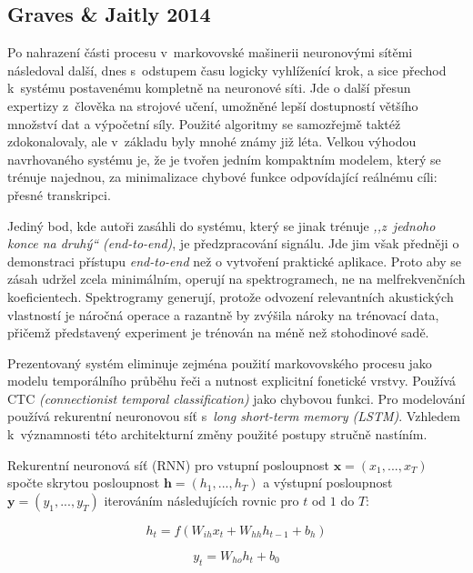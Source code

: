 \subsection{Graves & Jaitly 2014}

Po nahrazení části procesu v~markovovské mašinerii neuronovými sítěmi následoval
další, dnes s~odstupem času logicky vyhlíženící krok, a sice přechod k~systému
postavenému kompletně na neuronové síti. Jde o další přesun expertizy z~člověka
na strojové učení, umožněné lepší dostupností většího množství dat a výpočetní
síly. Použité algoritmy se samozřejmě taktéž zdokonalovaly, ale v~základu byly
mnohé známy již léta. Velkou výhodou navrhovaného systému je, že je tvořen jedním kompaktním
modelem, který se trénuje najednou, za minimalizace chybové funkce odpovídající
reálnému cíli: přesné transkripci.

Jediný bod, kde autoři zasáhli do systému, který se jinak trénuje \textit{,,z~jednoho
konce na druhý`` (end-to-end)}, je předzpracování signálu. Jde jim však předněji
o demonstraci přístupu \textit{end-to-end} než o vytvoření praktické aplikace.
Proto aby se zásah udržel zcela minimálním, operují na spektrogramech, ne na
melfrekvenčních koeficientech. Spektrogramy generují, protože odvození
relevantních akustických vlastností je náročná operace a razantně by zvýšila
nároky na trénovací data, přičemž představený experiment je trénován na méně než
stohodinové sadě.

Prezentovaný systém eliminuje zejména použití markovovského procesu jako modelu
temporálního průběhu řeči a nutnost explicitní fonetické vrstvy. Používá CTC
\textit{(connectionist temporal classification)}\cite{graves2006connectionist} jako chybovou funkci. Pro
modelování používá rekurentní neuronovou síť s~\textit{long short-term memory
(LSTM)}\cite{hochreiter1997long}. Vzhledem k~významnosti této architekturní změny použité postupy stručně
nastíním.

Rekurentní neuronová síť (RNN) pro vstupní posloupnost $\bm{x} = (x_1, ..., x_T)$
spočte skrytou posloupnost $\bm{h} = (h_1, ..., h_T)$ a výstupní posloupnost
$\bm{y} = (y_1, ..., y_T)$ iterováním následujících rovnic pro $t$ od $1$ do $T$:

\begin{equation}
h_t = f(W_{ih}x_t + W_{hh}h_{t-1} + b_h)
\end{equation}

\begin{equation}
y_t = W_{ho}h_t + b_0
\end{equation}


